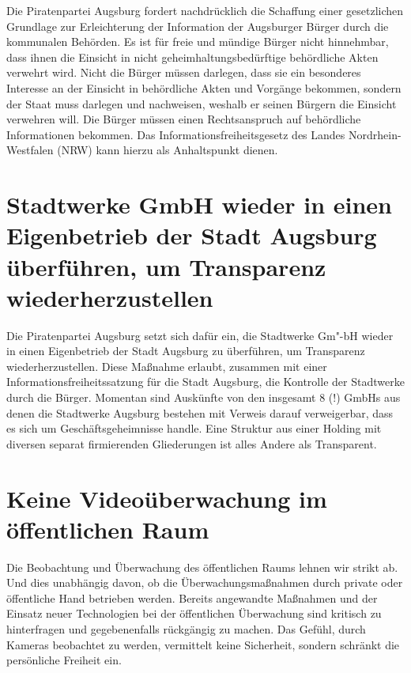   Die Piratenpartei Augsburg fordert nachdrücklich die Schaffung einer 
  gesetzlichen Grundlage zur Erleichterung der Information der Augsburger 
  Bürger durch die kommunalen Behörden. Es ist für freie und mündige Bürger 
  nicht hinnehmbar, dass ihnen die Einsicht in nicht geheimhaltungsbedürftige 
  behördliche Akten verwehrt wird. Nicht die Bürger müssen darlegen, dass sie 
  ein besonderes Interesse an der Einsicht in behördliche Akten und Vorgänge 
  bekommen, sondern der Staat muss darlegen und nachweisen, weshalb er seinen 
  Bürgern die Einsicht verwehren will. Die Bürger müssen einen Rechtsanspruch 
  auf behördliche Informationen bekommen. Das Informationsfreiheitsgesetz des 
  Landes Nordrhein-Westfalen (NRW) kann hierzu als Anhaltspunkt dienen.
  
  \section{Stadtwerke GmbH wieder in einen Eigenbetrieb der Stadt Augsburg 
  überführen, um Transparenz wiederherzustellen}
  
  Die Piratenpartei Augsburg setzt sich dafür ein, die Stadtwerke Gm"-bH 
  wieder 
  in einen Eigenbetrieb der Stadt Augsburg zu überführen, um Transparenz 
  wiederherzustellen. Diese Maßnahme erlaubt, zusammen mit einer 
  Informationsfreiheitssatzung für die Stadt Augsburg, die Kontrolle der 
  Stadtwerke durch die Bürger. Momentan sind Auskünfte von den insgesamt 8 (!) 
  GmbHs aus denen die Stadtwerke Augsburg bestehen mit Verweis darauf 
  verweigerbar, dass es sich um Geschäftsgeheimnisse handle. Eine Struktur aus 
  einer   Holding mit diversen separat firmierenden Gliederungen ist alles Andere 
  als Transparent.
  
  \section{Keine Videoüberwachung im öffentlichen Raum}
  
  Die Beobachtung und Überwachung des öffentlichen Raums lehnen wir strikt ab. 
  Und dies unabhängig davon, ob die Überwachungsmaßnahmen durch private oder 
  öffentliche Hand betrieben werden. Bereits angewandte Maßnahmen und der 
  Einsatz neuer Technologien bei der öffentlichen Überwachung sind kritisch zu 
  hinterfragen und gegebenenfalls rückgängig zu machen. Das Gefühl, durch 
  Kameras beobachtet zu werden, vermittelt keine Sicherheit, sondern schränkt 
  die persönliche Freiheit ein.
  
